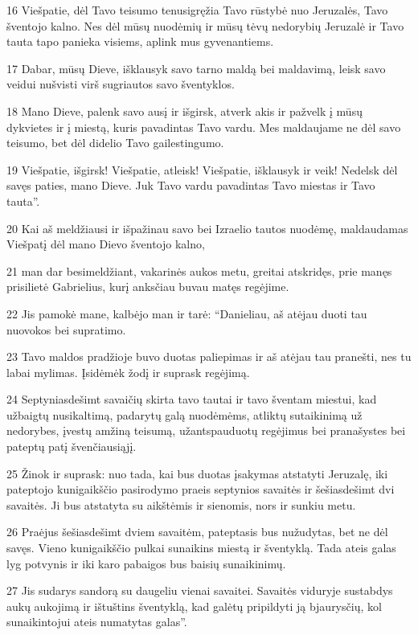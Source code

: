 \par 16 Viešpatie, dėl Tavo teisumo tenusigręžia Tavo rūstybė nuo Jeruzalės, Tavo šventojo kalno. Nes dėl mūsų nuodėmių ir mūsų tėvų nedorybių Jeruzalė ir Tavo tauta tapo panieka visiems, aplink mus gyvenantiems. 
\par 17 Dabar, mūsų Dieve, išklausyk savo tarno maldą bei maldavimą, leisk savo veidui nušvisti virš sugriautos savo šventyklos. 
\par 18 Mano Dieve, palenk savo ausį ir išgirsk, atverk akis ir pažvelk į mūsų dykvietes ir į miestą, kuris pavadintas Tavo vardu. Mes maldaujame ne dėl savo teisumo, bet dėl didelio Tavo gailestingumo. 
\par 19 Viešpatie, išgirsk! Viešpatie, atleisk! Viešpatie, išklausyk ir veik! Nedelsk dėl savęs paties, mano Dieve. Juk Tavo vardu pavadintas Tavo miestas ir Tavo tauta”. 
\par 20 Kai aš meldžiausi ir išpažinau savo bei Izraelio tautos nuodėmę, maldaudamas Viešpatį dėl mano Dievo šventojo kalno, 
\par 21 man dar besimeldžiant, vakarinės aukos metu, greitai atskridęs, prie manęs prisilietė Gabrielius, kurį anksčiau buvau matęs regėjime. 
\par 22 Jis pamokė mane, kalbėjo man ir tarė: “Danieliau, aš atėjau duoti tau nuovokos bei supratimo. 
\par 23 Tavo maldos pradžioje buvo duotas paliepimas ir aš atėjau tau pranešti, nes tu labai mylimas. Įsidėmėk žodį ir suprask regėjimą. 
\par 24 Septyniasdešimt savaičių skirta tavo tautai ir tavo šventam miestui, kad užbaigtų nusikaltimą, padarytų galą nuodėmėms, atliktų sutaikinimą už nedorybes, įvestų amžiną teisumą, užantspauduotų regėjimus bei pranašystes bei pateptų patį švenčiausiąjį. 
\par 25 Žinok ir suprask: nuo tada, kai bus duotas įsakymas atstatyti Jeruzalę, iki pateptojo kunigaikščio pasirodymo praeis septynios savaitės ir šešiasdešimt dvi savaitės. Ji bus atstatyta su aikštėmis ir sienomis, nors ir sunkiu metu. 
\par 26 Praėjus šešiasdešimt dviem savaitėm, pateptasis bus nužudytas, bet ne dėl savęs. Vieno kunigaikščio pulkai sunaikins miestą ir šventyklą. Tada ateis galas lyg potvynis ir iki karo pabaigos bus baisių sunaikinimų. 
\par 27 Jis sudarys sandorą su daugeliu vienai savaitei. Savaitės viduryje sustabdys aukų aukojimą ir ištuštins šventyklą, kad galėtų pripildyti ją bjaurysčių, kol sunaikintojui ateis numatytas galas”.



